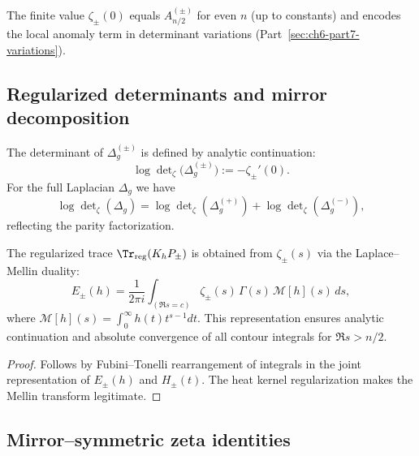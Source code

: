 \begin{remark}
\label{rem:zeta0}
The finite value $\zeta_\pm(0)$ equals $A_{n/2}^{(\pm)}$ for even $n$ (up to constants) and encodes the local anomaly term in determinant variations (Part~\ref{sec:ch6-part7-variations}). %
\end{remark}

\subsection{Regularized determinants and mirror decomposition}
\label{subsec:ch6-part2-determinant} \relax

\begin{definition}
\label{def:determinant}
The determinant of $\Delta_g^{(\pm)}$ is defined by analytic continuation:
\[
\log\det\nolimits_{\zeta}\!\big(\Delta_g^{(\pm)}\big):=-\zeta_\pm'(0).
\]
For the full Laplacian $\Delta_g$ we have
\[
\log\det\nolimits_{\zeta}\!(\Delta_g)
=\log\det\nolimits_{\zeta}\!(\Delta_g^{(+)})
+\log\det\nolimits_{\zeta}\!(\Delta_g^{(-)}),
\]
reflecting the parity factorization. %
\end{definition}

\begin{proposition}
\label{prop:zeta-trace}
The regularized trace $\Tr_{\mathrm{reg}}(K_hP_\pm)$ is obtained from $\zeta_\pm(s)$ via the Laplace–Mellin duality:
\[
E_\pm(h)
=\frac{1}{2\pi i}\int_{(\Re s=c)} \zeta_\pm(s)\,\Gamma(s)\,\mathcal{M}[h](s)\,ds,
\]
where $\mathcal{M}[h](s)=\int_0^\infty h(t)t^{s-1}dt$.  
This representation ensures analytic continuation and absolute convergence of all contour integrals for $\Re s>n/2$. %
\end{proposition}

\begin{proof}
Follows by Fubini–Tonelli rearrangement of integrals in the joint representation of $E_\pm(h)$ and $H_\pm(t)$. The heat kernel regularization makes the Mellin transform legitimate. %
\end{proof}

\subsection{Mirror–symmetric zeta identities}
\label{subsec:ch6-part2-mirror-zeta} \relax


